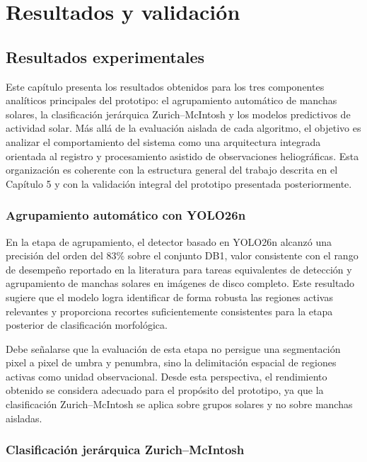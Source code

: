 \chapter[Resultados y validación]{Resultados y validación\label{cap:resultados}}

\section{Resultados experimentales}
\label{sec:results}

Este capítulo presenta los resultados obtenidos para los tres componentes
analíticos principales del prototipo: el agrupamiento automático de manchas
solares, la clasificación jerárquica Zurich--McIntosh y los modelos predictivos
de actividad solar. Más allá de la evaluación aislada de cada algoritmo, el
objetivo es analizar el comportamiento del sistema como una arquitectura
integrada orientada al registro y procesamiento asistido de observaciones
heliográficas. Esta organización es coherente con la estructura general del
trabajo descrita en el Capítulo 5 y con la validación integral del prototipo
presentada posteriormente. 

\subsection{Agrupamiento automático con YOLO26n}

En la etapa de agrupamiento, el detector basado en YOLO26n alcanzó una
precisión del orden del $83\%$ sobre el conjunto DB1, valor consistente con el
rango de desempeño reportado en la literatura para tareas equivalentes de
detección y agrupamiento de manchas solares en imágenes de disco completo.
Este resultado sugiere que el modelo logra identificar de forma robusta las
regiones activas relevantes y proporciona recortes suficientemente consistentes
para la etapa posterior de clasificación morfológica.

Debe señalarse que la evaluación de esta etapa no persigue una segmentación
pixel a pixel de umbra y penumbra, sino la delimitación espacial de regiones
activas como unidad observacional. Desde esta perspectiva, el rendimiento
obtenido se considera adecuado para el propósito del prototipo, ya que la
clasificación Zurich--McIntosh se aplica sobre grupos solares y no sobre manchas
aisladas.

\subsection{Clasificación jerárquica Zurich--McIntosh}

